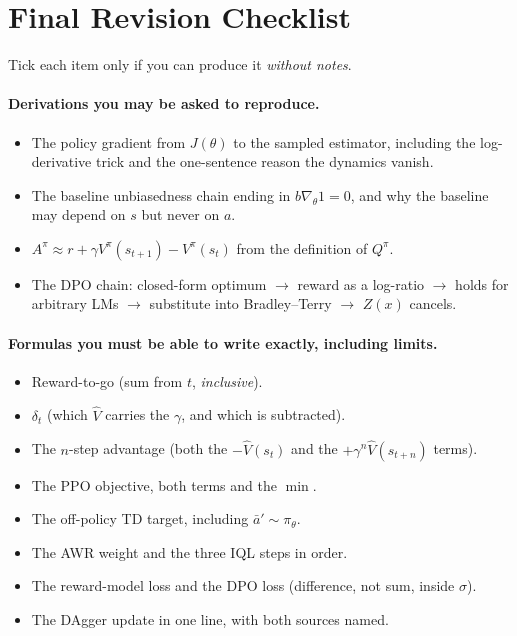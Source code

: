\documentclass[11pt,a4paper]{article}
\begin{document}
\newpage
\section{Final Revision Checklist}

Tick each item only if you can produce it \emph{without notes}.

\paragraph{Derivations you may be asked to reproduce.}
\begin{itemize}
\item[$\square$] The policy gradient from $J(\theta)$ to the sampled
estimator, including the log-derivative trick and the one-sentence reason the
dynamics vanish.
\item[$\square$] The baseline unbiasedness chain ending in $b\nabla_\theta1=0$,
and why the baseline may depend on $s$ but never on $a$.
\item[$\square$] $A^\pi\approx r+\gamma V^\pi(s_{t+1})-V^\pi(s_t)$ from the
definition of $Q^\pi$.
\item[$\square$] The DPO chain: closed-form optimum $\rightarrow$ reward as a
log-ratio $\rightarrow$ holds for arbitrary LMs $\rightarrow$ substitute into
Bradley--Terry $\rightarrow$ $Z(x)$ cancels.
\end{itemize}

\paragraph{Formulas you must be able to write exactly, including limits.}
\begin{itemize}
\item[$\square$] Reward-to-go (sum from $t$, \emph{inclusive}).
\item[$\square$] $\delta_t$ (which $\hat V$ carries the $\gamma$, and which is
subtracted).
\item[$\square$] The $n$-step advantage (both the $-\hat V(s_t)$ and the
$+\gamma^n\hat V(s_{t+n})$ terms).
\item[$\square$] The PPO objective, both terms and the $\min$.
\item[$\square$] The off-policy TD target, including $\bar a'\sim\pi_\theta$.
\item[$\square$] The AWR weight and the three IQL steps in order.
\item[$\square$] The reward-model loss and the DPO loss (difference, not sum,
inside $\sigma$).
\item[$\square$] The DAgger update in one line, with both sources named.
\end{itemize}
\end{document}

